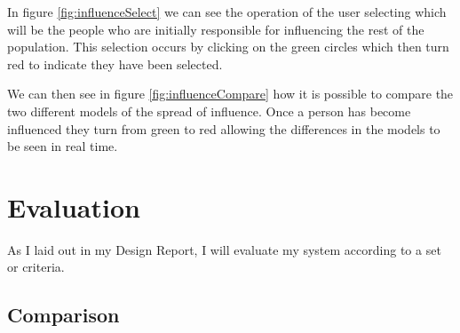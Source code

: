 \documentclass[12pt,a4paper]{article}
\begin{document}
In figure \ref{fig:influenceSelect} we can see the operation of the user selecting which will be the people who are initially responsible for influencing the rest of the population. This selection occurs by clicking on the green circles which then turn red to indicate they have been selected.

We can then see in figure \ref{fig:influenceCompare} how it is possible to compare the two different models of the spread of influence. Once a person has become influenced they turn from green to red allowing the differences in the models to be seen in real time.

\section{Evaluation}

As I laid out in my Design Report, I will evaluate my system according to a set or criteria.

\subsection{Comparison}
\end{document}
